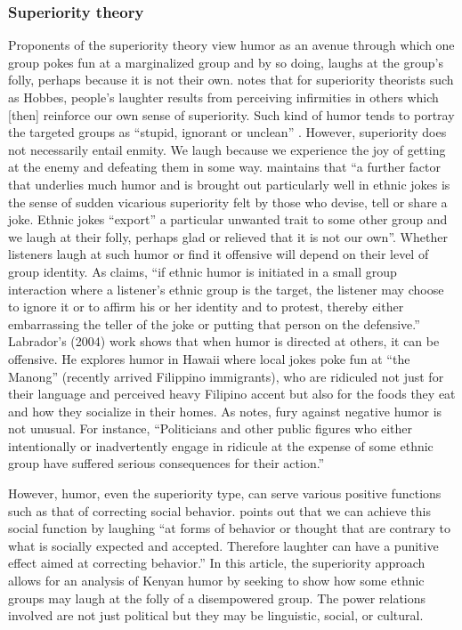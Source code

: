\documentclass[output=paper]{langsci/langscibook}
\begin{document}
\subsubsection{Superiority theory}

Proponents of the superiority theory view humor as an avenue through which one group pokes fun at a marginalized group and by so doing, laughs at the group’s folly, perhaps because it is not their own. \citet[8]{Carroll2014} notes that for superiority theorists such as Hobbes, people’s laughter results from perceiving infirmities in others which [then] reinforce our own sense of superiority. Such kind of humor tends to portray the targeted groups as “stupid, ignorant or unclean” \citep[115]{Apte1985}. However, superiority does not necessarily entail enmity. We laugh because we experience the joy of getting at the enemy and defeating them in some way. \citet[7]{Davies1990} maintains that “a further factor that underlies much humor and is brought out particularly well in ethnic jokes is the sense of sudden vicarious superiority felt by those who devise, tell or share a joke. Ethnic jokes “export” a particular unwanted trait to some other group and we laugh at their folly, perhaps glad or relieved that it is not our own”. Whether listeners laugh at such humor or find it offensive will depend on their level of group identity. As \citet[34]{Apte1987} claims, “if ethnic humor is initiated in a small group interaction where a listener’s ethnic group is the target, the listener may choose to ignore it or to affirm his or her identity and to protest, thereby either embarrassing the teller of the joke or putting that person on the defensive.” Labrador’s (2004) work shows that when humor is directed at others, it can be offensive. He explores humor in Hawaii where local jokes poke fun at “the Manong” (recently arrived Filippino immigrants), who are ridiculed not just for their language and perceived heavy Filipino accent but also for the foods they eat and how they socialize in their homes. As \citet[35]{Apte1987} notes, fury against negative humor is not unusual. For instance, “Politicians and other public figures who either intentionally or inadvertently engage in ridicule at the expense of some ethnic group have suffered serious consequences for their action.”

However, humor, even the superiority type, can serve various positive functions such as that of correcting social behavior. \citet[x]{Ziv1988} points out that we can achieve this social function by laughing “at forms of behavior or thought that are contrary to what is socially expected and accepted. Therefore laughter can have a punitive effect aimed at correcting behavior.” In this article, the superiority approach allows for an analysis of Kenyan humor by seeking to show how some ethnic groups may laugh at the folly of a disempowered group. The power relations involved are not just political but they may be linguistic, social, or cultural. 
\end{document}
